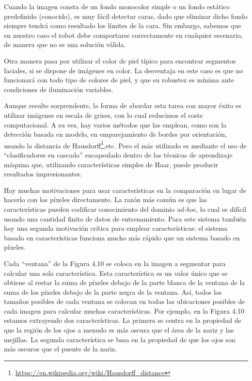 Cuando la imagen consta de un fondo monocolor simple o un fondo estático predefinido (conocido), es muy fácil detectar caras, dado que eliminar dicho fondo siempre tendrá como resultado los límites de la cara. Sin embargo, sabemos que en nuestro caso el robot debe comportarse correctamente en cualquier escenario, de manera que no es una solución válida.

Otra manera pasa por utilizar el color de piel típico para encontrar segmentos faciales, si se dispone de imágenes en color. La desventaja en este caso es que no funcionará con todo tipo de colores de piel, y que su robustez es mínima ante condiciones de iluminación variables. 

Aunque resulte sorprendente, la forma de abordar esta tarea con mayor éxito es utilizar imágenes en escala de grises, con lo cual reducimos el coste computacional. A su vez, hay varios métodos que las emplean, como son la detección basada en modelo, en emparejamiento de bordes por orientación, usando la distancia de Hausdorff\footnote{\url{https://en.wikipedia.org/wiki/Hausdorff_distance}},etc. Pero el más utilizado es mediante el uso de ``clasificadores en cascada'' encapsulado dentro de las técnicas de aprendizaje máquina que, utilizando características simples de Haar, puede producir resultados impresionantes.

Hay muchas motivaciones para usar características en la comparación en lugar de hacerlo con los píxeles directamente. La razón más común es que las características pueden codificar conocimiento del dominio \textit{ad-hoc}, lo cual es difícil usando una cantidad finita de datos de entrenamiento. Para este sistema también hay una segunda motivación crítica para emplear características: el sistema basado en características funciona mucho más rápido que un sistema basado en píxeles. 

Cada “ventana” de la Figura 4.10 se coloca en la imagen a segmentar para calcular una sola característica. Esta característica es un valor único que se obtiene al restar la suma de píxeles debajo de la parte blanca de la ventana de la suma de los píxeles debajo de la parte negra de la ventana. Así, todos los tamaños posibles de cada ventana se colocan en todas las ubicaciones posibles de cada imagen para calcular muchas características. Por ejemplo, en la Figura 4.10 estamos extrayendo dos características. La primera se centra en la propiedad de que la región de los ojos a menudo es más oscura que el área de la nariz y las mejillas. La segunda característica se basa en la propiedad de que los ojos son más oscuros que el puente de la nariz.

